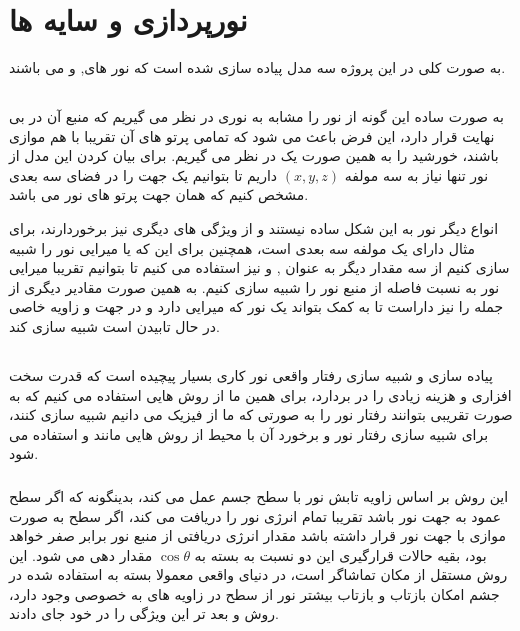 \documentclass[a4paper, 12pt]{book}
\begin{document}
\newpage
{}
\section*{\huge{نورپردازی و سایه ها}}
\vspace*{0.6cm}
\noindent
\normalsize

    به صورت کلی در این پروژه سه مدل پیاده سازی شده است که  نور های,  و  می باشند.
\subsection*{}
    به صورت ساده این گونه از نور را مشابه به نوری در نظر می گیریم که منبع آن در بی نهایت قرار دارد، این فرض باعث می شود که تمامی پرتو های آن تقریبا با هم موازی باشند، خورشید را به همین صورت یک  در نظر می گیریم. برای بیان کردن این مدل از نور تنها نیاز به سه مولفه
    $(x, y, z)$
    داریم تا بتوانیم یک جهت را در فضای سه بعدی مشخص کنیم که همان جهت پرتو های نور می باشد.\par
    انواع دیگر نور به این شکل ساده نیستند و از ویژگی های دیگری نیز برخوردارند، برای مثال  دارای یک مولفه سه بعدی  است، همچنین برای این که  یا میرایی نور را شبیه سازی کنیم از سه مقدار دیگر به عنوان ,  و  نیز استفاده می کنیم تا بتوانیم تقریبا میرایی نور به نسبت فاصله از منبع نور را شبیه سازی کنیم. به همین صورت مقادیر دیگری از جمله  را نیز داراست تا به کمک  بتواند یک نور که میرایی دارد و در جهت و زاویه خاصی در حال تابیدن است شبیه سازی کند.

\subsection*{}
    پیاده سازی و شبیه سازی رفتار واقعی نور کاری بسیار پیچیده است که قدرت سخت افزاری و هزینه زیادی را در بردارد، برای همین ما از روش هایی استفاده می کنیم که به صورت تقریبی بتوانند رفتار نور را به صورتی که ما از فیزیک می دانیم شبیه سازی کنند، برای شبیه سازی رفتار نور و برخورد آن با محیط از روش هایی مانند  و  استفاده می شود.

    \subsubsection*{}
        این روش بر اساس زاویه تابش نور با سطح جسم عمل می کند، بدینگونه که اگر سطح عمود به جهت نور باشد تقریبا تمام انرژی نور را دریافت می کند، اگر سطح به صورت موازی با جهت نور قرار داشته باشد مقدار انرژی دریافتی از منبع نور برابر صفر خواهد بود، بقیه حالات قرارگیری این دو نسبت به بسته به
        $\cos \theta$
        مقدار دهی می شود. این روش مستقل از مکان تماشاگر است، در دنیای واقعی معمولا بسته به  استفاده شده در جشم امکان بازتاب و بازتاب بیشتر نور از سطح در زاویه های به خصوصی وجود دارد، روش  و بعد تر  این ویژگی را در خود جای دادند.
\end{document}
